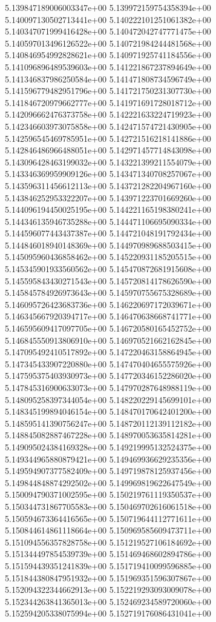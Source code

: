 5.139847189006003347e+00
5.139972159754358394e+00
5.140097130502713441e+00
5.140222101251061382e+00
5.140347071999416428e+00
5.140472042747771475e+00
5.140597013496126522e+00
5.140721984244481568e+00
5.140846954992828621e+00
5.140971925741184556e+00
5.141096896489539603e+00
5.141221867237894649e+00
5.141346837986250584e+00
5.141471808734596749e+00
5.141596779482951796e+00
5.141721750231307730e+00
5.141846720979662777e+00
5.141971691728018712e+00
5.142096662476373758e+00
5.142221633224719923e+00
5.142346603973075858e+00
5.142471574721430905e+00
5.142596545469785951e+00
5.142721516218141886e+00
5.142846486966488051e+00
5.142971457714843098e+00
5.143096428463199032e+00
5.143221399211554079e+00
5.143346369959909126e+00
5.143471340708257067e+00
5.143596311456612113e+00
5.143721282204967160e+00
5.143846252953322207e+00
5.143971223701669260e+00
5.144096194450025195e+00
5.144221165198380241e+00
5.144346135946735288e+00
5.144471106695090334e+00
5.144596077443437387e+00
5.144721048191792434e+00
5.144846018940148369e+00
5.144970989688503415e+00
5.145095960436858462e+00
5.145220931185205515e+00
5.145345901933560562e+00
5.145470872681915608e+00
5.145595843430271543e+00
5.145720814178626590e+00
5.145845784926973643e+00
5.145970755675328689e+00
5.146095726423683736e+00
5.146220697172039671e+00
5.146345667920394717e+00
5.146470638668741771e+00
5.146595609417097705e+00
5.146720580165452752e+00
5.146845550913806910e+00
5.146970521662162845e+00
5.147095492410517892e+00
5.147220463158864945e+00
5.147345433907220880e+00
5.147470404655575926e+00
5.147595375403930973e+00
5.147720346152286020e+00
5.147845316900633073e+00
5.147970287648988119e+00
5.148095258397344054e+00
5.148220229145699101e+00
5.148345199894046154e+00
5.148470170642401200e+00
5.148595141390756247e+00
5.148720112139112182e+00
5.148845082887467228e+00
5.148970053635814281e+00
5.149095024384169328e+00
5.149219995132524375e+00
5.149344965880879421e+00
5.149469936629235356e+00
5.149594907377582409e+00
5.149719878125937456e+00
5.149844848874292502e+00
5.149969819622647549e+00
5.150094790371002595e+00
5.150219761119350537e+00
5.150344731867705583e+00
5.150469702616061518e+00
5.150594673364416565e+00
5.150719644112771611e+00
5.150844614861118664e+00
5.150969585609473711e+00
5.151094556357828758e+00
5.151219527106184692e+00
5.151344497854539739e+00
5.151469468602894786e+00
5.151594439351241839e+00
5.151719410099596885e+00
5.151844380847951932e+00
5.151969351596307867e+00
5.152094322344662913e+00
5.152219293093009078e+00
5.152344263841365013e+00
5.152469234589720060e+00
5.152594205338075994e+00
5.152719176086431041e+00
